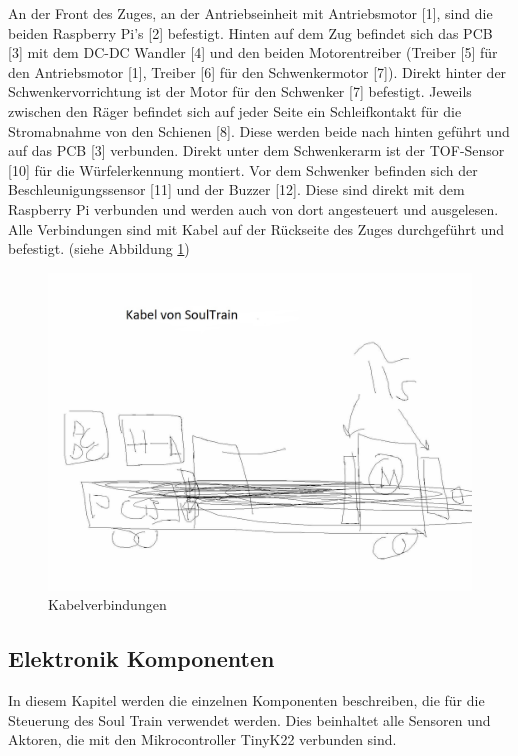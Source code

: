 \documentclass[../../main.tex]{subfiles}
\begin{document}
    An der Front des Zuges, an der Antriebseinheit mit Antriebsmotor [1], sind die beiden Raspberry Pi's [2] befestigt. Hinten auf dem Zug befindet sich das PCB [3] mit dem DC-DC Wandler [4] und den beiden Motorentreiber (Treiber [5] für den Antriebsmotor [1], Treiber [6] für den Schwenkermotor [7]). Direkt hinter der Schwenkervorrichtung ist der Motor für den Schwenker [7] befestigt. Jeweils zwischen den Räger befindet sich auf jeder Seite ein Schleifkontakt für die Stromabnahme von den Schienen [8]. Diese werden beide nach hinten geführt und auf das PCB [3] verbunden. Direkt unter dem Schwenkerarm ist der TOF-Sensor [10] für die Würfelerkennung montiert. Vor dem Schwenker befinden sich der Beschleunigungssensor [11] und der Buzzer [12]. Diese sind direkt mit dem Raspberry Pi verbunden und werden auch von dort angesteuert und ausgelesen.\\
     Alle Verbindungen sind mit Kabel auf der Rückseite des Zuges durchgeführt und befestigt. (siehe Abbildung \ref{fig:et_kabel})\\

    \begin{figure}[H]
        \centering
        \includegraphics[width=1.0\textwidth]{../../images/et/et_kabel.jpg}
        \caption {Kabelverbindungen}
        \label{fig:et_kabel}
    \end{figure}

    \subsection{Elektronik Komponenten} \label{et_Komponenten}
    In diesem Kapitel werden die einzelnen Komponenten beschreiben, die für die Steuerung des Soul Train verwendet werden. Dies beinhaltet alle Sensoren und Aktoren, die mit den Mikrocontroller TinyK22 verbunden sind.
\end{document}
